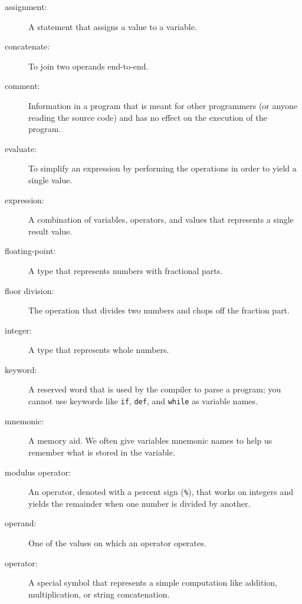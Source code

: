 \begin{description}

\item[assignment:]  A statement that assigns a value to a variable.

\item[concatenate:]  To join two operands end-to-end.

\item[comment:]  Information in a program that is meant for other
programmers (or anyone reading the source code) and has no effect on the
execution of the program.

\item[evaluate:]  To simplify an expression by performing the operations
in order to yield a single value.

\item[expression:]  A combination of variables, operators, and values that
represents a single result value.

\item[floating-point:] A type that represents numbers with fractional
parts.

\item[floor division:] The operation that divides two numbers and chops off
the fraction part.

\item[integer:] A type that represents whole numbers.

\item[keyword:]  A reserved word that is used by the compiler to parse a
program; you cannot use keywords like {\tt if}, {\tt  def}, and {\tt while} as
variable names.

\item[mnemonic:] A memory aid. We often give variables mnemonic names
to help us remember what is stored in the variable.

\item[modulus operator:]  An operator, denoted with a percent sign
({\tt \%}), that works on integers and yields the remainder when one
number is divided by another.

\item[operand:]  One of the values on which an operator operates.

\item[operator:]  A special symbol that represents a simple computation like
addition, multiplication, or string concatenation.


\end{description}
